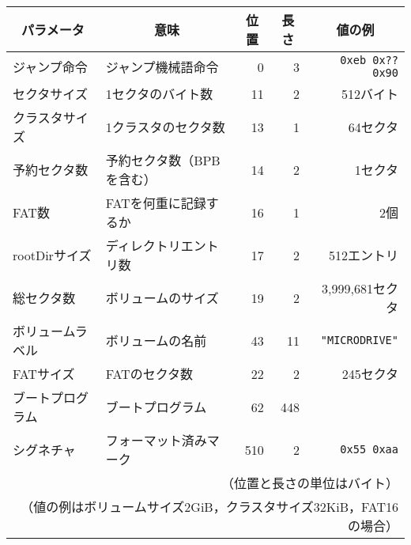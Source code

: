 \documentclass{standalone}
\begin{document}
\begin{tabular}{l | l | r | r | r}\hline\hline
  \multicolumn{1}{c|}{パラメータ} &
  \multicolumn{1}{c|}{意味} &
  \multicolumn{1}{c|}{位置} &
  \multicolumn{1}{c|}{長さ} &
  \multicolumn{1}{c}{値の例}\\\hline
  ジャンプ命令     & ジャンプ機械語命令 & 0 & 3 & \texttt{0xeb 0x?? 0x90} \\
  セクタサイズ     & 1セクタのバイト数 & 11 & 2 & 512バイト \\
  クラスタサイズ   & 1クラスタのセクタ数& 13 & 1 & 64セクタ \\
  予約セクタ数     & 予約セクタ数（BPBを含む）& 14 & 2 & 1セクタ \\
  FAT数            & FATを何重に記録するか& 16 & 1 & 2個 \\
  rootDirサイズ    & ディレクトリエントリ数 &  17 & 2 & 512エントリ \\
  総セクタ数       & ボリュームのサイズ & 19 & 2 & 3,999,681セクタ \\
  ボリュームラベル & ボリュームの名前 & 43 & 11 
                   & \texttt{"MICRODRIVE\textvisiblespace"} \\
  FATサイズ        & FATのセクタ数    & 22 & 2  & 245セクタ \\
  ブートプログラム & ブートプログラム & 62 & 448 & \\
  シグネチャ       & フォーマット済みマーク & 510 & 2 & \texttt{0x55 0xaa} \\
  \multicolumn{5}{r}{
    （位置と長さの単位はバイト）}\\
  \multicolumn{5}{r}{
    （値の例はボリュームサイズ2GiB，クラスタサイズ32KiB，FAT16の場合）}
\end{tabular}
\end{document}
